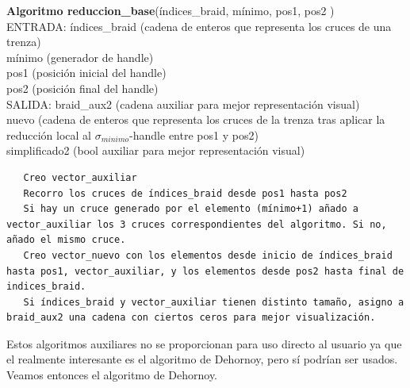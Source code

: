 \begin{alg}
	\textbf{Algoritmo reduccion\_base}(índices\_braid, mínimo, pos1, pos2 )\\
	ENTRADA: índices\_braid (cadena de enteros que representa los cruces de una trenza)\\
	\hspace*{2.2cm} mínimo (generador de handle) \\
	\hspace*{2.2cm} pos1 (posición inicial del handle) \\
	\hspace*{2.2cm} pos2 (posición final del handle)\\
	SALIDA: \hspace{0.4cm} braid\_aux2 (cadena auxiliar para mejor representación visual) \\
	\hspace*{2.2cm} nuevo (cadena de enteros que representa los cruces de la trenza tras aplicar la reducción local al $\sigma_{minimo}$-handle entre pos1 y pos2)\\
	\hspace*{2.2cm} simplificado2 (bool auxiliar para mejor representación visual)
	
\begin{lstlisting}
   Creo vector_auxiliar
   Recorro los cruces de índices_braid desde pos1 hasta pos2
   Si hay un cruce generado por el elemento (mínimo+1) añado a vector_auxiliar los 3 cruces correspondientes del algoritmo. Si no, añado el mismo cruce. 
   Creo vector_nuevo con los elementos desde inicio de índices_braid hasta pos1, vector_auxiliar, y los elementos desde pos2 hasta final de indices_braid.
   Si índices_braid y vector_auxiliar tienen distinto tamaño, asigno a braid_aux2 una cadena con ciertos ceros para mejor visualización.
\end{lstlisting}
\end{alg}


Estos algoritmos auxiliares no se proporcionan para uso directo al usuario ya que el realmente interesante es el algoritmo de Dehornoy, pero sí podrían ser usados. Veamos entonces el algoritmo de Dehornoy.\\

